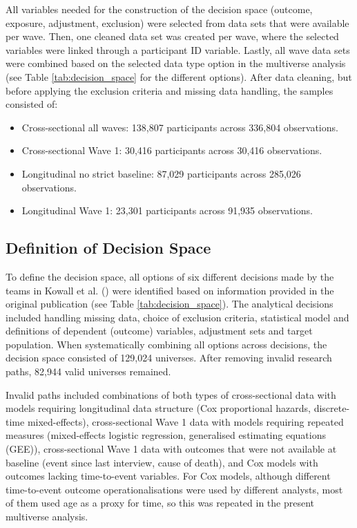 \documentclass[
  man,
  floatsintext,
  longtable,
  nolmodern,
  notxfonts,
  notimes,
  colorlinks=true,linkcolor=blue,citecolor=blue,urlcolor=blue]{apa7}
\providecommand{\tightlist}{%
  \setlength{\itemsep}{0pt}\setlength{\parskip}{0pt}}
\begin{document}
All variables needed for the construction of the decision space
(outcome, exposure, adjustment, exclusion) were selected from data sets
that were available per wave. Then, one cleaned data set was created per
wave, where the selected variables were linked through a participant ID
variable. Lastly, all wave data sets were combined based on the selected
data type option in the multiverse analysis (see Table
\ref{tab:decision_space} for the different options). After data
cleaning, but before applying the exclusion criteria and missing data
handling, the samples consisted of:

\begin{itemize}
\tightlist
\item
  Cross-sectional all waves: 138,807 participants across 336,804
  observations.
\item
  Cross-sectional Wave 1: 30,416 participants across 30,416
  observations.
\item
  Longitudinal no strict baseline: 87,029 participants across 285,026
  observations.
\item
  Longitudinal Wave 1: 23,301 participants across 91,935 observations.
\end{itemize}

\subsection{Definition of Decision
Space}\label{definition-of-decision-space}

To define the decision space, all options of six different decisions
made by the teams in Kowall et al.
() were identified based on
information provided in the original publication (see Table
\ref{tab:decision_space}). The analytical decisions included handling
missing data, choice of exclusion criteria, statistical model and
definitions of dependent (outcome) variables, adjustment sets and target
population. When systematically combining all options across decisions,
the decision space consisted of 129,024 universes. After removing
invalid research paths, 82,944 valid universes remained.

Invalid paths included combinations of both types of cross-sectional
data with models requiring longitudinal data structure (Cox proportional
hazards, discrete-time mixed-effects), cross-sectional Wave 1 data with
models requiring repeated measures (mixed-effects logistic regression,
generalised estimating equations (GEE)), cross-sectional Wave 1 data
with outcomes that were not available at baseline (event since last
interview, cause of death), and Cox models with outcomes lacking
time-to-event variables. For Cox models, although different
time-to-event outcome operationalisations were used by different
analysts, most of them used age as a proxy for time, so this was
repeated in the present multiverse analysis.
\end{document}
